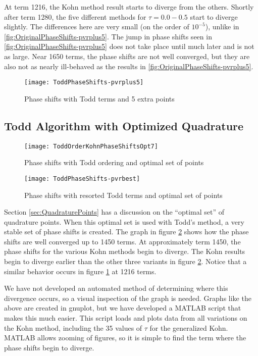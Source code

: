 \documentclass[Dissertation.tex]{subfiles}
\begin{document}
At term 1216, the Kohn method result starts to diverge from the others. 
Shortly after term 1280, the five different methods for $\tau = 0.0 - 0.5$ 
start to diverge slightly. The differences here are very small (on the order 
of $10^{-5}$), unlike in \cref{fig:OriginalPhaseShifts-pvrplus5}. The 
jump in phase shifts seen in \cref{fig:OriginalPhaseShifts-pvrplus5} 
does not take place until much later and is not as large. Near 1650 terms, 
the phase shifts are not well converged, but they are also not as nearly
ill-behaved as the results in \cref{fig:OriginalPhaseShifts-pvrplus5}.

\begin{figure}[H]
	\centering
	\texttt{[image: ToddPhaseShifts-pvrplus5]}
	\caption{Phase shifts with Todd terms and 5 extra points}
	\label{fig:ToddPhaseShifts-pvrplus5}
\end{figure}


\subsection{Todd Algorithm with Optimized Quadrature}


\begin{figure}[H]
	\centering
	\texttt{[image: ToddOrderKohnPhaseShiftsOpt7]}
	\caption{Phase shifts with Todd ordering and optimal set of points}
	\label{fig:ToddOrderKohnPhaseShiftsOpt7}
\end{figure}


\begin{figure}[H]
	\centering
	\texttt{[image: ToddPhaseShifts-pvrbest]}
	\caption{Phase shifts with resorted Todd terms and optimal set of points}
	\label{fig:ToddPhaseShifts-pvroptimized}
\end{figure}

Section \ref{sec:QuadraturePoints} has a discussion on the ``optimal set'' of quadrature points. When this optimal set is used with Todd's method, a very stable set of phase shifts is created. The graph in figure \ref{fig:ToddOrderKohnPhaseShiftsOpt7} shows how the phase shifts are well converged up to 1450 terms. At approximately term 1450, the phase shifts for the various Kohn methods begin to diverge. The Kohn results begin to diverge earlier than the other three variants in figure \ref{fig:ToddOrderKohnPhaseShiftsOpt7}. Notice that a similar behavior occurs in figure \ref{fig:ToddPhaseShifts-pvrplus5} at 1216 terms.

We have not developed an automated method of determining where this divergence occurs, so a visual inspection of the graph is needed. Graphs like the above are created in gnuplot, but we have developed a MATLAB script that makes this much easier. This script loads and plots data from all variations on the Kohn method, including the 35 values of $\tau$ for the generalized Kohn. MATLAB allows zooming of figures, so it is simple to find the term where the phase shifts begin to diverge.
\end{document}
